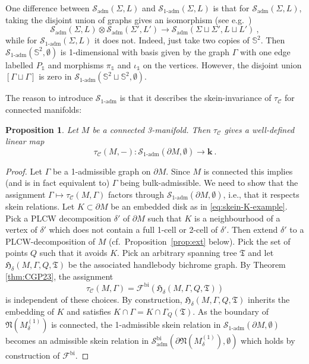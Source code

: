 \documentclass[11pt]{amsart}
\newtheorem{prop}[thm]{Proposition}
\theoremstyle{definition}
\numberwithin{equation}{section}
\def\bd{{\partial}}
\def\adm{\operatorname{adm}}
\def\cgpt{\mathscr{F}}
\def\nb{\mathfrak{N}}
\def\sk{\cS}
\newcommand{\spnTree}{\fT}
\def\cC{\mathcal{C}}
\def\cS{\mathcal{S}}
\def\bS{{\mathbb{S}}}
\def\kk{{\bm{k}}}
\def\de{\delta}
\def\fH{\mathfrak{H}}
\def\fT{{\mathfrak{T}}}
\def\1{{\mathds{1}}}
\def\to{\rightarrow}
\begin{document}
One difference between $\sk_{\adm}(\Sigma,L)$ and $\sk_{1\text{-adm}}(\Sigma,L)$ is that for $\sk_{\adm}(\Sigma,L)$, taking the disjoint union of graphs gives an isomorphism (see e.g.\ \cite[Lem.\,2.9]{RST24})
\begin{equation}
    \sk_{\adm}(\Sigma,L) \otimes \sk_{\adm}(\Sigma',L') \to \sk_{\adm}(\Sigma \sqcup \Sigma',L \sqcup L') \ ,
\end{equation}
while for $\sk_{1\text{-adm}}(\Sigma,L)$ it does not. Indeed, just take two copies of $\bS^2$. Then $\sk_{1\text{-adm}}(\bS^2,\emptyset)$ is 1-dimensional with basis given by the graph $\Gamma$ with one edge labelled $P_\1$ and morphisms $\pi_\1$ and $\iota_\1$ on the vertices. However, the disjoint union $[\Gamma \sqcup \Gamma]$ is zero in $\sk_{1\text{-adm}}(\bS^2 \sqcup \bS^2,\emptyset)$.

The reason to introduce $\sk_{1\text{-adm}}$ is that it describes the skein-invariance of $\tau_\cC$ for connected manifolds:

\begin{prop}\label{prop:skein}
Let $M$ be a connected 3-manifold. Then $\tau_\cC$ gives a well-defined linear map
\[
    \tau_\cC(M,-) : \sk_{\operatorname{1-adm}}(\bd M,\emptyset) \to \kk \ .
\]
\end{prop}

\begin{proof}
Let $\Gamma$ be a 1-admissible graph on $\bd M$. Since $M$ is connected this implies (and is in fact equivalent to) $\Gamma$ being bulk-admissible. We need to show that the assignment $\Gamma \mapsto \tau_\cC(M,\Gamma)$ factors through $\sk_{1\text{-adm}}(\bd M,\emptyset)$, i.e., that it respects skein relations. Let $K \subset \bd M$ be an embedded disk as in \eqref{eq:skein-K-example}. Pick a PLCW decomposition $\delta'$ of $\bd M$ such that $K$ is a neighbourhood of a vertex of $\delta'$ which does not contain a full 1-cell or 2-cell of $\delta'$. Then extend $\delta'$ to a PLCW-decomposition of $M$ (cf.\ Proposition~\ref{prop:ext} below).
Pick the set of points $Q$ such that it avoids $K$. Pick an arbitrary spanning tree $\spnTree$ and let $\fH_{\de}(M, \Gamma, Q, \spnTree)$ be the associated handlebody bichrome graph. By 
Theorem \ref{thm:CGP23}, the assignment
\[
\tau_{\cC}(M, \Gamma) = \cgpt^\mathrm{bi}(\fH_{\de}(M, \Gamma, Q, \spnTree)) 
\]
is independent of these choices. By construction,
$\fH_{\de}(M, \Gamma, Q, \spnTree)$ inherits the embedding of $K$ and satisfies $K \cap \Gamma = K \cap \Gamma_{Q}(\spnTree)$. As the boundary of $\nb(M^{(1)}_{\de})$ is connected, the 1-admissible skein relation in $\sk_{1\text{-adm}}(\bd M,\emptyset)$ becomes an admissible skein relation in $\sk_{\adm}^\mathrm{bi}(\bd \nb(M^{(1)}_{\de}),\emptyset)$ which holds by construction of $\cgpt^\mathrm{bi}$.
\end{proof}
\end{document}
